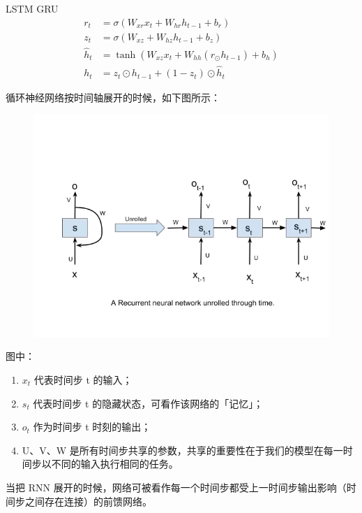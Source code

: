 \documentclass{article}
\begin{document}
LSTM GRU
\begin{equation}
\begin{split}
r_t &= \sigma(W_{xr}x_t+W_{hr}h_{t-1}+b_r)\\
z_t &= \sigma(W_{xz}+W_{hz}h_{t-1}+b_z)\\
\hat{h}_t &= \tanh(W_{xz}x_t+W_{hh}(r_\odot h_{t-1})+b_h)\\
h_t &= z_t\odot h_{t-1}+(1-z_t)\odot\hat{h}_t
\end{split}
\end{equation}























循环神经网络按时间轴展开的时候，如下图所示：
\begin{figure}[H]
\includegraphics[scale=0.5]{rnn_unroll.png}
\end{figure}
图中：
\begin{enumerate}
\item $x_t$ 代表时间步 t 的输入；
\item $s_t$ 代表时间步 t 的隐藏状态，可看作该网络的「记忆」；
\item $o_t$ 作为时间步 t 时刻的输出；
\item U、V、W 是所有时间步共享的参数，共享的重要性在于我们的模型在每一时间步以不同的输入执行相同的任务。
\end{enumerate}
当把 RNN 展开的时候，网络可被看作每一个时间步都受上一时间步输出影响（时间步之间存在连接）的前馈网络。
\end{document}

